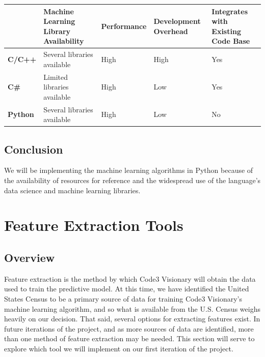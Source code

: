 \documentclass[onecolumn, draftclsnofoot,10pt, compsoc]{IEEEtran}
\begin{document}
        \begin{center}
        \begin{singlespace}
        \begin{tabular}{ |p{3cm}|p{4cm}|p{2cm}|p{2cm}|p{4cm}| }

        \hline
        
         & \textbf{Machine Learning Library Availability} 
         & \textbf{Performance}
         & \textbf{Development Overhead}
         & \textbf{Integrates with Existing Code Base} \\
         \hline
         \textbf{C/C++}
         & Several libraries available 
         & High 
         & High
         & Yes \\
         \hline
         \textbf{C\#} 
         & Limited libraries available 
         & High 
         & Low
         & Yes \\ 
         \hline
        \textbf{Python} 
        & Several libraries available
        & High
        & Low
        & No \\
        \hline
        \end{tabular}
        \end{singlespace}
        \end{center}
    
    \subsection{Conclusion}
    We will be implementing the machine learning algorithms in Python because of the availability of resources for reference and the widespread use of the language's data science and machine learning libraries.

    
\section{Feature Extraction Tools}
    \subsection{Overview}
    Feature extraction is the method by which Code3 Visionary will obtain the data used to train the predictive model. 
    At this time, we have identified the United States Census to be a primary source of data for training Code3 Visionary's machine learning algorithm, and so what is available from the U.S. Census weighs heavily on our decision.
    That said, several options for extracting features exist.
    In future iterations of the project, and as more sources of data are identified, more than one method of feature extraction may be needed.
    This section will serve to explore which tool we will implement on our first iteration of the project.
    
\end{document}
